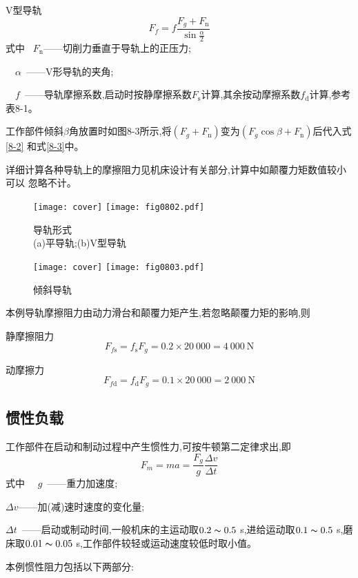 V型导轨
\begin{equation}
    \label{8-3}
    F_f=f\frac{F_g+ F_{\text{n}}}{\sin{\frac{\alpha}{2}}}
\end{equation}
式中
\ $F_{\text{n}}$——切削力垂直于导轨上的正压力;

\ \ $\alpha$\ ——V形导轨的夹角;

\ \ $f$\ ——导轨摩擦系数,启动时按静摩擦系数$F_{\text{s}}$计算,其余按动摩擦系数$f_{\text{d}}$计算,参考表8-1。

工作部件倾斜$\beta$角放置时如图8-3所示,将$(F_g+F_{\text{n}})$变为$(F_g\cos{\beta}+F_{\text{n}})$后代入式\ref{8-2}
和式\ref{8-3}中。

详细计算各种导轨上的摩擦阻力见机床设计有关部分,计算中如颠覆力矩数值较小可以
忽略不计。

\begin{figure}
    \centering
    \ifOpenSource
    \texttt{[image: cover]}
    \else
    \texttt{[image: fig0802.pdf]}
    \fi
    \caption{导轨形式\\(a)平导轨;(b)V型导轨}
    \label{fig:fig0802}
\end{figure}

\begin{figure}
    \centering
    \ifOpenSource
    \texttt{[image: cover]}
    \else
    \texttt{[image: fig0803.pdf]}
    \fi
    \caption{倾斜导轨}
    \label{fig:fig0803}
\end{figure}

本例导轨摩擦阻力由动力滑台和颠覆力矩产生,若忽略颠覆力矩的影响,则

静摩擦阻力
$$F_{f\text{s}}=f_{\text{s}}F_g=0.2\times 20\ 000=4\ 000\ \text{N}$$

动摩擦力
$$F_{f\text{d}}=f_{\text{d}}F_g=0.1\times 20\ 000=2\ 000\ \text{N}$$

\subsection{惯性负载}
工作部件在启动和制动过程中产生惯性力,可按牛顿第二定律求出,即
\begin{equation}
    F_m=ma=\frac{F_g}{g}\frac{\Delta v}{\Delta t}
\end{equation}
式中
\ \ $g$\ ——重力加速度;

$\Delta v$——加(减)速时速度的变化量;

$\Delta t$\ ——启动或制动时间,一般机床的主运动取$0.2\thicksim 0.5$ s,进给运动取$0.1\thicksim 0.5$ s,磨床取$0.01\thicksim 0.05$ s,工作部件较轻或运动速度较低时取小值。

本例惯性阻力包括以下两部分:


